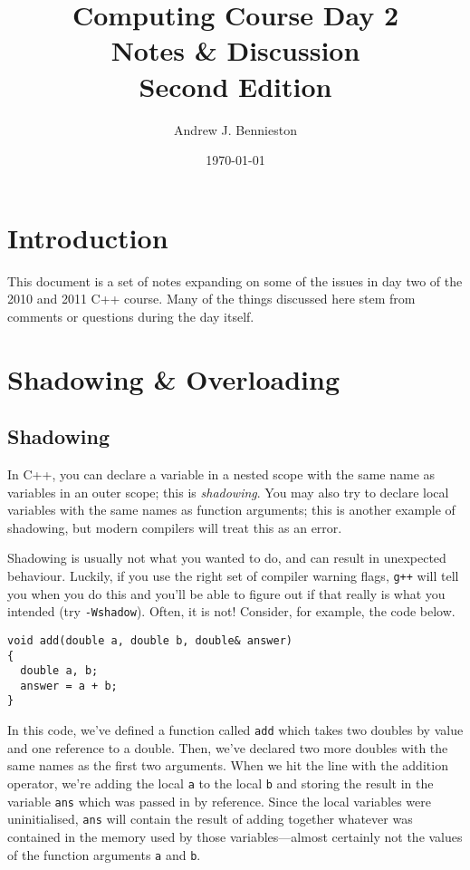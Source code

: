 \documentclass[a4paper]{scrartcl}
\title{Computing Course Day 2\\
Notes \& Discussion\\
Second Edition}
\author{Andrew J. Bennieston}
\date{\today}
\begin{document}
\maketitle

\tableofcontents

\pagebreak

\section{Introduction}
This document is a set of notes expanding on some of the issues in day two of the 2010 and 2011 C++ course. Many of the things discussed here stem from comments or questions during the day itself.

\section{Shadowing \& Overloading}
\subsection{Shadowing}
In C++, you can declare a variable in a nested scope with the same name as variables in an outer scope; this is \emph{shadowing}. You may also try to declare local variables with the same names as function arguments; this is another example of shadowing, but modern compilers will treat this as an error.

Shadowing is usually not what you wanted to do, and can result in unexpected behaviour. Luckily, if you use the right set of compiler warning flags, \verb|g++| will tell you when you do this and you'll be able to figure out if that really is what you intended (try \texttt{-Wshadow}). Often, it is not! Consider, for example, the code below.
\begin{verbatim}
void add(double a, double b, double& answer)
{
  double a, b;
  answer = a + b;
}
\end{verbatim}

In this code, we've defined a function called \verb|add| which takes two doubles by value and one reference to a double. Then, we've declared two more doubles with the same names as the first two arguments. When we hit the line with the addition operator, we're adding the local \verb|a| to the local \verb|b| and storing the result in the variable \verb|ans| which was passed in by reference. Since the local variables were uninitialised, \verb|ans| will contain the result of adding together whatever was contained in the memory used by those variables---almost certainly not the values of the function arguments \verb|a| and \verb|b|.
\end{document}
